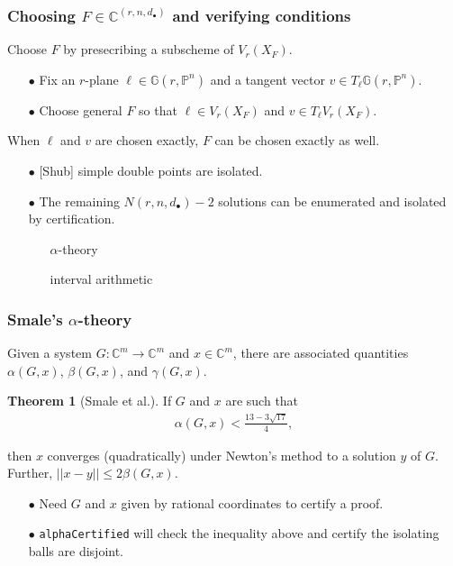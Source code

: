 \documentclass{beamer}
\theoremstyle{definition}
\newtheorem{thm}{Theorem}
\begin{document}
\begin{frame}
\frametitle{Choosing $F\in\mathbb{C}^{(r,n,d_\bullet)}$ and verifying conditions}
Choose $F$ by presecribing a subscheme of $V_r(X_F)$.
\begin{enumerate}
\item[$\bullet$] Fix an $r$-plane $\ell\in\mathbb{G}(r,\mathbb{P}^n)$ and a tangent vector $v\in T_\ell\mathbb{G}(r,\mathbb{P}^n)$. 

\item[$\bullet$] Choose general $F$ so that $\ell\in V_r(X_F)$ and $v\in T_\ell V_r(X_F)$.
\end{enumerate}

When $\ell$ and $v$ are chosen exactly, $F$ can be chosen exactly as well.
\begin{enumerate}
\item[$\bullet$] [Shub] simple double points are isolated.

\item[$\bullet$] The remaining $N(r,n,d_\bullet)-2$ solutions can be enumerated and isolated by certification.
\begin{enumerate}
\item[\scalebox{.7}{$\blacksquare$}] $\alpha$-theory

\item[\scalebox{.7}{$\blacksquare$}] interval arithmetic
\end{enumerate}
\end{enumerate}




\end{frame}






\begin{frame}
\frametitle{Smale's $\alpha$-theory}
Given a system $G:\mathbb{C}^m\to\mathbb{C}^m$ and $x\in\mathbb{C}^m$, there are associated quantities $\alpha(G,x)$, $\beta(G,x)$, and $\gamma(G,x)$. 

\begin{thm}[Smale et al.]
\vspace{-.1cm}
If $G$ and $x$ are such that
\vspace{-.2cm}
\begin{align*}
\alpha(G,x) < \frac{13-3\sqrt{17}}{4},
\end{align*}
\vspace{-.85cm}

then $x$ converges (quadratically) under Newton's method to a solution $y$ of $G$. Further, $||x-y||\le 2\beta(G,x)$.
\end{thm}

\begin{enumerate}
\item[$\bullet$] Need $G$ and $x$ given by rational coordinates to certify a proof.

\item[$\bullet$] \texttt{alphaCertified} will check the inequality above and certify the isolating balls are disjoint. 
\end{enumerate}
\end{frame}
\end{document}
